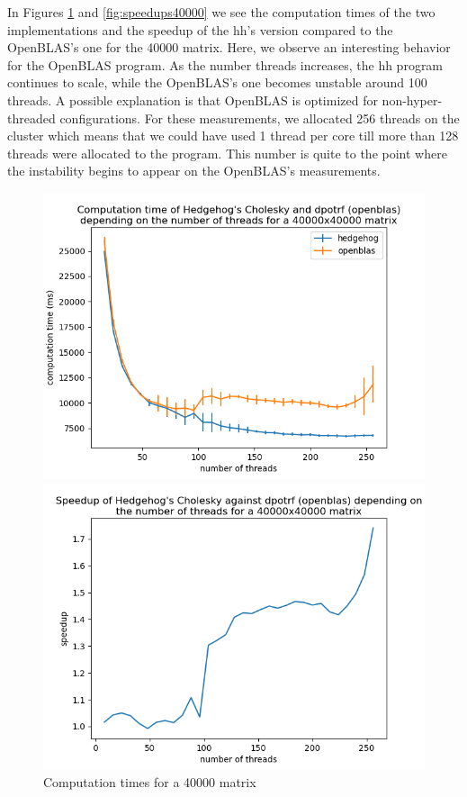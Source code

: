 In Figures \ref{fig:time40000} and \ref{fig:speedups40000} we see the
computation times of the two implementations and the speedup of the \gls{hh}'s
version compared to the OpenBLAS's one for the 40000 matrix. Here, we observe an
interesting behavior for the OpenBLAS program. As the number threads increases,
the \gls{hh} program continues to scale, while the OpenBLAS's one becomes
unstable around 100 threads. A possible explanation is that OpenBLAS is
optimized for non-hyper-threaded configurations. For these measurements, we
allocated 256 threads on the cluster which means that we could have used 1
thread per core till more than 128 threads were allocated to the program. This
number is quite to the point where the instability begins to appear on the
OpenBLAS's measurements.

\begin{figure}[!htb]
  \begin{minipage}{0.48\linewidth}
    \centering
    \includegraphics[scale=0.5]{img/cho-img/times-40000.png}
    \caption{Computation times for a 40000 matrix}
    \label{fig:time40000}
  \end{minipage}\hfill
  \begin{minipage}{0.48\linewidth}
    \centering
    \includegraphics[scale=0.5]{img/cho-img/speedup-40000.png}

\end{minipage}
\end{figure}

